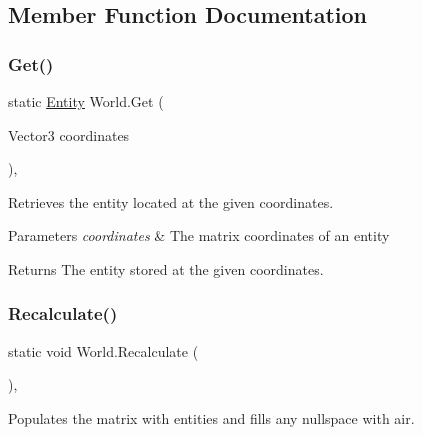 \subsection{Member Function Documentation}
\mbox{\label{class_world_a6329d86f62ec9cf32fed26a74f68e878}} 
\subsubsection{\texorpdfstring{Get()}{Get()}}
{\footnotesize\ttfamily static \mbox{\hyperlink{class_entity}{Entity}} World.\+Get (\begin{DoxyParamCaption}\item[{Vector3}]{coordinates }\end{DoxyParamCaption})\hspace{0.3cm}{\ttfamily [inline]}, {\ttfamily [static]}}



Retrieves the entity located at the given coordinates. 


\begin{DoxyParams}{Parameters}
{\em coordinates} & The matrix coordinates of an entity \\
\hline
\end{DoxyParams}
\begin{DoxyReturn}{Returns}
The entity stored at the given coordinates. 
\end{DoxyReturn}
\mbox{\label{class_world_aafe2420b96ed8e71db9837b1517d093c}} 
\subsubsection{\texorpdfstring{Recalculate()}{Recalculate()}}
{\footnotesize\ttfamily static void World.\+Recalculate (\begin{DoxyParamCaption}{ }\end{DoxyParamCaption})\hspace{0.3cm}{\ttfamily [inline]}, {\ttfamily [static]}}



Populates the matrix with entities and fills any nullspace with air. 

